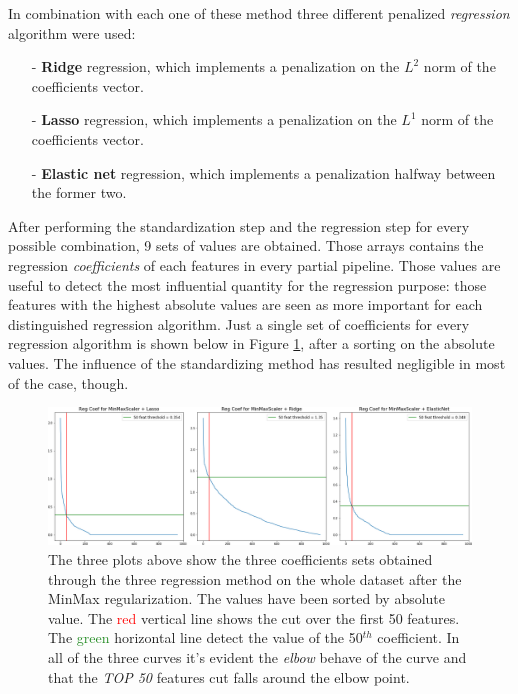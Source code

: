 \documentclass{article}
\begin{document}
In combination with each one of these method three different penalized \emph{regression} algorithm were used:

\begin{itemize}
\item [-]\textbf{Ridge} regression, which implements a penalization on the $L^2$ norm of the coefficients vector.
\item [-]\textbf{Lasso} regression, which implements a penalization on the $L^1$ norm of the coefficients vector.
\item [-]\textbf{Elastic net} regression, which implements a penalization halfway between the former two.
\end{itemize}

After performing the standardization step and the regression step for every possible combination, 9 sets of values are obtained. Those arrays contains the regression \emph{coefficients} of each features in every partial pipeline. Those values are useful to detect the most influential quantity for the regression purpose: those features with the highest absolute values are seen as more important for each distinguished regression algorithm. Just a single set of coefficients for every regression algorithm is shown below in Figure \ref{fig:3_coef}, after a sorting on the absolute values. The influence of the standardizing method has resulted negligible in most of the case, though.

\begin{figure}[h]
	\includegraphics[width=\textwidth]{one_set_coefs.png}
	\caption{The three plots above show the three coefficients sets obtained through the three regression method on the whole dataset after the MinMax regularization. The values have been sorted by absolute value. The \textcolor{red}{red} vertical line shows the cut over the first 50 features. The \textcolor{ForestGreen}{green}  horizontal line detect the value of the 50$^{th}$ coefficient. In all of the three curves it's evident the \emph{elbow} behave of the curve and that the \emph{TOP 50} features cut falls around the elbow point.}
	\label{fig:3_coef}
	\centering
\end{figure}
\end{document}
